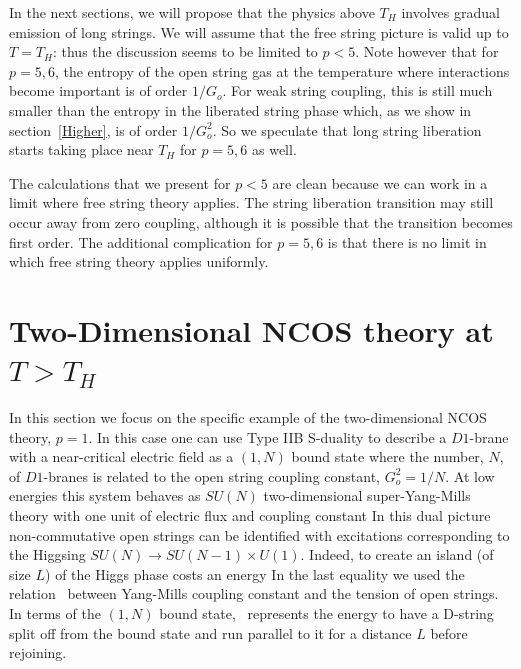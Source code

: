 In the next sections, we will propose that the physics above $T_H$
involves gradual emission of long strings.  We will assume that the
free string picture is valid up to $T=T_H$: thus the discussion seems to be
limited to $p<5$.  Note however that for $p=5,6$, the entropy of the
open string gas at the temperature where interactions become important
is of order $1/G_o$.  For weak string coupling, this is still much
smaller than the entropy in the liberated string phase which, as we
show in section~\ref{Higher}, is of order $1/G_o^2$.  So we speculate
that long string liberation starts taking place near $T_H$ for $p=5,6$
as well.

The calculations that we present for $p < 5$ are clean because we can
work in a limit where free string theory applies.  The string
liberation transition may still occur away from zero coupling,
although it is possible that the transition becomes first order.  The
additional complication for $p=5,6$ is that there is no limit in which
free string theory applies uniformly.





\section{Two-Dimensional NCOS theory at $T>T_H$}
\label{HighT}

In this section we focus on the specific example of the
two-dimensional NCOS theory, $p=1$.  In this case one can use Type IIB
S-duality to describe a $D1$-brane with a near-critical electric field
as a $(1,N)$ bound state \cite{SchwarzStrings,WittenBound} where the
number, $N$, of $D1$-branes is related to the open string coupling
constant, $G_o^2 = 1/N$.  At low energies this system behaves as
$SU(N)$ two-dimensional super-Yang-Mills theory with one unit of
electric flux and coupling constant
 In this dual picture non-commutative open strings can be identified
with excitations corresponding to the Higgsing $SU(N) \to SU(N-1)
\times U(1)$.  Indeed, to create an island (of size $L$) of the Higgs
phase costs an energy \cite{GMSS,KM}
 In the last equality we used the relation \gym\ between Yang-Mills
coupling constant and the tension of open strings.  In terms of the
$(1,N)$ bound state, \tens\ represents the energy to have a
D-string split off from the bound state and run parallel to
it for a distance $L$ before rejoining.

